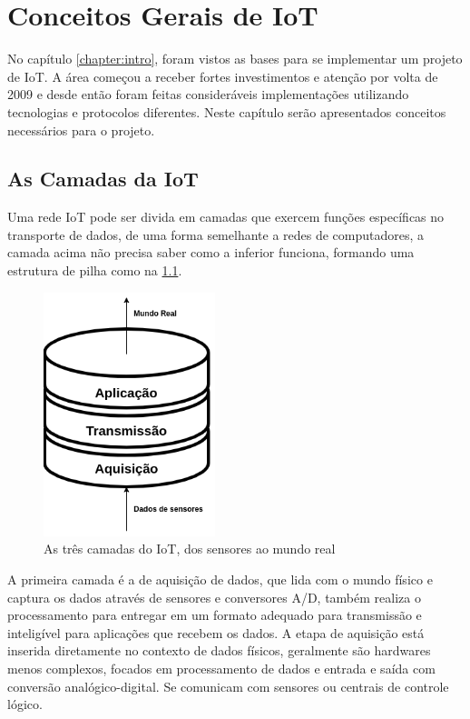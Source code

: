 \chapter{Conceitos Gerais de IoT}
\label{chapter:coneceitos}

No capítulo \ref{chapter:intro}, foram vistos as bases para se implementar um projeto de IoT. A área começou a receber fortes investimentos e atenção por volta de 2009 \cite{Rampim:iot} e desde então foram feitas consideráveis implementações utilizando tecnologias e protocolos diferentes. Neste capítulo serão apresentados conceitos necessários para o projeto.

\section{As Camadas da IoT}
\label{section:camadas_iot}

Uma rede IoT pode ser divida em camadas que exercem funções específicas no transporte de dados, de uma forma semelhante a redes de computadores, a camada acima não precisa saber como a inferior funciona, formando uma estrutura de pilha como na \ref{fig:1.2.0/camadas_iot}.

\begin{figure}[h!]
\centering
\includegraphics[width=5cm]{./02_Capitulos/02_Cap1/figures/iot_stack}
\caption{As três camadas do IoT, dos sensores ao mundo real}
\label{fig:1.2.0/camadas_iot}
\end{figure}

A primeira camada é a de aquisição de dados, que lida com o mundo físico e captura os dados através de sensores e conversores A/D, também realiza o processamento para entregar em um formato adequado para transmissão e inteligível para aplicações que recebem os dados. A etapa de aquisição está inserida diretamente no contexto de dados físicos, geralmente são hardwares menos complexos, focados em processamento de dados e entrada e saída com conversão analógico-digital. Se comunicam com sensores ou centrais de controle lógico.

